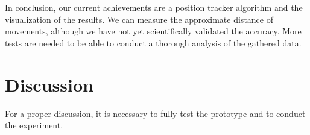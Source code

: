 \documentclass[12pt,twoside, hidelinks]{article}
\begin{document}
In conclusion, our current achievements are a position tracker algorithm and the visualization of the results. We can measure the approximate distance of movements, although we have not yet scientifically validated the accuracy. More tests are needed to be able to conduct a thorough analysis of the gathered data.

\section{Discussion}
\label{sec:discussion}
For a proper discussion, it is necessary to fully test the prototype and to conduct the experiment.

\newpage




\end{document}
